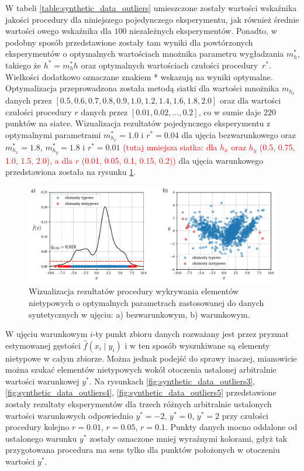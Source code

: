 \documentclass[12pt,a4paper,oneside]{book}
\theoremstyle{definition}
\begin{document}
\noindent W tabeli \ref{table:synthetic_data_outliers} umieszczone zostały wartości wskaźnika jakości procedury dla niniejszego pojedynczego eksperymentu, jak również średnie wartości owego wskaźnika dla $100$ niezależnych eksperymentów. Ponadto, w podobny sposób przedstawione zostały tam wyniki dla powtórzonych eksperymentów o optymalnych wartościach mnożnika parametru wygładzania $m_h^*$, takiego że $h^*=m_h^*h$ oraz optymalnych wartościach czułości procedury~$r^*$. Wielkości dodatkowo oznaczane znakiem * wskazują na wyniki optymalne. Optymalizacja przeprowadzona została metodą siatki dla wartości mnożnika $m_{h_x}$ danych przez $[0.5, 0.6, 0.7, 0.8, 0.9, 1.0, 1.2, 1.4, 1.6, 1.8, 2.0]$ oraz dla wartości czułości procedury $r$ danych przez $[0.01, 0.02, ..., 0.2]$, co w sumie daje $220$ punktów na siatce. Wizualizacja rezultatów pojedynczego eksperymentu z optymalnymi parametrami $m_{h_x}^*=1.0$ i $r^*=0.04$ dla ujęcia bezwarunkowego oraz $m_{h_x}^*=1.8$, $m_{h_y}^*=1.8$ i $r^*=0.01$ \textcolor{red}{(tutaj mniejsza siatka: dla $h_x$ oraz $h_y$ (0.5, 0.75, 1.0, 1.5, 2.0), a dla $r$ (0.01, 0.05, 0.1, 0.15, 0.2))} dla ujęcia warunkowego przedstawiona została na rysunku \ref{fig:synthetic_data_outliers2}.
\begin{figure}[H]
    \centering
    \includegraphics[scale=0.6]{synthetic_data_outliers_kde_and_ckde2}
    \vspace{-0.5cm} 
    \caption{Wizualizacja rezultatów procedury wykrywania elementów nietypowych  o optymalnych parametrach zastosowanej do danych syntetycznych w ujęciu: a) bezwarunkowym, b) warunkowym.}
	\label{fig:synthetic_data_outliers2}
\end{figure}
W ujęciu warunkowym $i$-ty punkt zbioru danych rozważany jest przez pryzmat estymowanej gęstości $\hat{f}(x_i \mid y_i)$ i w ten sposób wyszukiwane są elementy nietypowe w całym zbiorze. Można jednak podejść do sprawy inaczej, mianowicie można szukać elementów nietypowych wokół otoczenia ustalonej arbitralnie wartości warunkowej $y^*$. Na rysunkach \ref{fig:synthetic_data_outliers3}, \ref{fig:synthetic_data_outliers4}, \ref{fig:synthetic_data_outliers5} przedstawione zostały rezultaty eksperymentów dla trzech różnych arbitralnie ustalonych wartości warunkowych odpowiednio $y^*=-2$, $y^*=0$, $y^*=2$ przy czułości procedury kolejno $r=0.01$, $r=0.05$, $r=0.1$. Punkty danych mocno oddalone od ustalonego warunku $y^*$ zostały oznaczone mniej wyraźnymi kolorami, gdyż tak przygotowana procedura ma sens tylko dla punktów położonych w otoczeniu wartości $y^*$.
\end{document}
